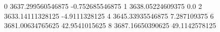 0 3637.299560546875 -0.752685546875
1 3638.05224609375 0.0
2 3633.14111328125 -4.9111328125
4 3645.33935546875 7.287109375
6 3681.00634765625 42.9541015625
8 3687.16650390625 49.1142578125
